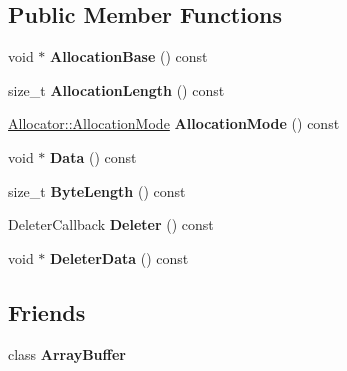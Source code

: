 \subsection*{Public Member Functions}
\begin{DoxyCompactItemize}
\item 
\mbox{\label{classv8_1_1ArrayBuffer_1_1Contents_a6982d157697f42fde9007989c0150d89}} 
void $\ast$ {\bfseries Allocation\+Base} () const
\item 
\mbox{\label{classv8_1_1ArrayBuffer_1_1Contents_abf5ffac83be8c88a602cce7b852f4a62}} 
size\+\_\+t {\bfseries Allocation\+Length} () const
\item 
\mbox{\label{classv8_1_1ArrayBuffer_1_1Contents_a82b2bbacac1a218439f80063af457287}} 
\mbox{\hyperlink{classv8_1_1ArrayBuffer_1_1Allocator_ab106d1fbad7be9f6fd8b0f5c550ac59e}{Allocator\+::\+Allocation\+Mode}} {\bfseries Allocation\+Mode} () const
\item 
\mbox{\label{classv8_1_1ArrayBuffer_1_1Contents_a4eaa3609be49d6fd2055971242c5a6e0}} 
void $\ast$ {\bfseries Data} () const
\item 
\mbox{\label{classv8_1_1ArrayBuffer_1_1Contents_ac4ca77bb59e6cbb004d9edaa79d30ad6}} 
size\+\_\+t {\bfseries Byte\+Length} () const
\item 
\mbox{\label{classv8_1_1ArrayBuffer_1_1Contents_adaa11444494fd9ea3c4444a86c4575ff}} 
Deleter\+Callback {\bfseries Deleter} () const
\item 
\mbox{\label{classv8_1_1ArrayBuffer_1_1Contents_a2c7a852906052acc7cda4a8b38a9a241}} 
void $\ast$ {\bfseries Deleter\+Data} () const
\end{DoxyCompactItemize}
\subsection*{Friends}
\begin{DoxyCompactItemize}
\item 
\mbox{\label{classv8_1_1ArrayBuffer_1_1Contents_acbcb25033a90500a51aa19c811b2a1d3}} 
class {\bfseries Array\+Buffer}
\end{DoxyCompactItemize}



